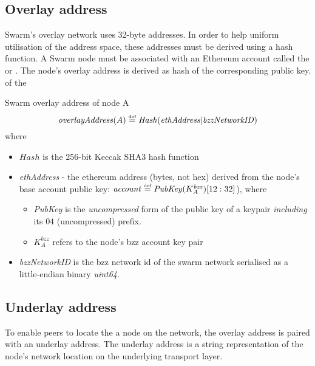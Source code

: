 \subsection{Overlay address \statusyellow}

Swarm's overlay network uses 32-byte addresses. In order to help  uniform utilisation of the address space,  these addresses must be derived using a hash function. A Swarm node must be associated with an Ethereum account called the  or .
The node's overlay address is derived as hash of the corresponding  public key.
 of the 

\begin{definition}{Swarm overlay address of node A}\label{def:overlay}
\begin{equation}
\mathit{overlayAddress}(A) \overset{\textrm{\tiny def}}{=} \mathit{Hash}(\mathit{ethAddress}|\mathit{bzzNetworkID})         
\end{equation}
where
\begin{itemize}
\item $\mathit{Hash}$ is the 256-bit Keccak SHA3 hash function
\item \emph{ethAddress} - the ethereum address  (bytes,  not hex) derived from the node's base account public key: $\mathit{account}\overset{\textrm{\tiny def}}{=}\mathit{PubKey}(K_A^\mathit{bzz})[12:32]$), where
    \begin{itemize}
    \item \emph{PubKey} is the \emph{uncompressed} form of the public key of a keypair \emph{including} its $04$ (uncompressed) prefix.
    \item $K_A^\mathit{bzz}$ refers to the node's bzz account key pair
    \end{itemize}
\item \emph{bzzNetworkID} is the bzz network id of the swarm network serialised as a little-endian binary \emph{uint64}.
\end{itemize}
\end{definition}

\subsection{Underlay address \statusyellow}

To enable peers to locate the a node on the network, the overlay address is paired with an underlay address. The underlay address is a string representation of the node's network location on the underlying transport layer. 


